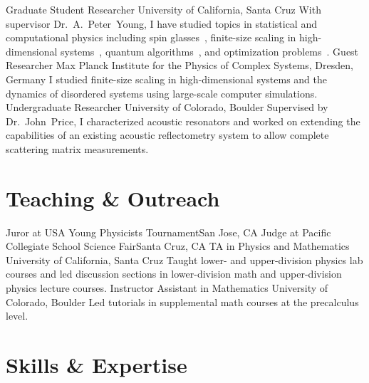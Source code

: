 \documentclass{cv}
\def\Peter{Dr.~A.~Peter~Young}
\def\John{Dr.~John~Price}
\begin{document}
\begin{cvjobs}
    {Graduate Student Researcher}
    {University of California, Santa Cruz}
    {With supervisor \Peter, I have studied topics in statistical and
     computational physics including
     spin glasses~\cite{wittmann2012spin, wittmann2013low, wittmann2014low},
     finite-size scaling in high-dimensional systems~\cite{wittmann2014finite},
     quantum algorithms~\cite{wittmann2014distinguishing,wittmann2014scheduling},
     and optimization problems~\cite{wittmann2014scheduling}.}
    {Guest Researcher}
    {Max Planck Institute for the Physics of Complex Systems, Dresden, Germany}
    {I studied finite-size scaling in high-dimensional systems and the
     dynamics of disordered systems using large-scale computer simulations.}
    {Undergraduate Researcher}
    {University of Colorado, Boulder}
    {Supervised by \John{}, I characterized acoustic resonators and worked on
     extending the capabilities of an existing acoustic reflectometry system to
     allow complete scattering matrix measurements.}
\end{cvjobs}

\section{Teaching \& Outreach}

\begin{cvjobs}
    {Juror at USA Young Physicists Tournament}{San Jose, CA}{}
  \cvjob{}{}
    {Judge at Pacific Collegiate School Science Fair}{Santa Cruz, CA}{}
    {TA in Physics and Mathematics}
    {University of California, Santa Cruz}
    {Taught lower- and upper-division physics lab courses and led discussion sections in
     lower-division math and upper-division physics lecture courses.}
    {Instructor Assistant in Mathematics}
    {University of Colorado, Boulder}
    {Led tutorials in supplemental math courses at the precalculus level.}
\end{cvjobs}

\section{Skills \& Expertise}
\end{document}
